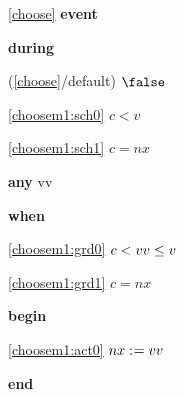 \noindent \ref{choose}  \textbf{event}
\begin{block}
  \item   \textbf{during}
  \begin{block}
  \item[ (\ref{choose}/default) ]\sout{$\false$} %
  \end{block}
  \begin{block}
  \item[ \eqref{choosem1:sch0} ]{$c < v$} %
  \item[ \eqref{choosem1:sch1} ]{$c = nx$} %
  \end{block}
  \item   \textbf{any} vv
  \item   \textbf{when}
  \begin{block}
  \item[ \eqref{choosem1:grd0} ]{$c < vv \le v$} %
  \item[ \eqref{choosem1:grd1} ]{$c = nx$} %
  \end{block}
  \item   \textbf{begin}
  \begin{block}
  \item[ \eqref{choosem1:act0} ]{$nx \mathrel{:\mkern1mu=} vv$} %
  \end{block}
  \item   \textbf{end} \\
\end{block}
